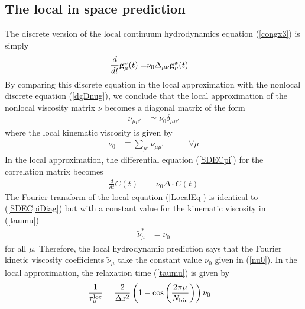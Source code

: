 \documentclass[b5paper,openright,10pt]{book}
\newcommand{\esc}{\!\cdot\!}
\begin{document}
\subsection{The local in space prediction}
The   discrete   version   of  the   local   continuum   hydrodynamics
equation (\ref{congx3}) is simply
\begin{align}
  \frac{d}{dt}{\bf g}^{x}_\mu(t)=&\nu_0\Delta_{\mu\nu}{\bf g}^{x}_\nu(t)
\label{gloc}
\end{align}
By comparing  this discrete equation  in the local  approximation with
the nonlocal  discrete equation  (\ref{dgDnug}), we conclude  that the
local approximation of the nonlocal viscosity matrix $\nu$ becomes a
diagonal matrix of the form
\begin{align}
\nu_{\mu\mu'}&\simeq \nu_0 \delta_{\mu\mu'}
\end{align}
where the local kinematic viscosity is given by
\begin{align}
\nu_0&\equiv \sum_{\mu'}\nu_{\mu\mu'} \quad \quad \quad\forall \mu
\label{nu0}
\end{align}
In the  local approximation, the differential  equation (\ref{SDECpi})
for the correlation matrix becomes
\begin{align}
  \frac{d}{dt}{C}(t)=&\nu_0{\Delta}\esc { C}(t)
  \label{LocalEq}
\end{align}
The Fourier transform of the local equation (\ref{LocalEq}) is identical to
(\ref{SDECpiDiag})  but  with  a  constant  value  for  the  kinematic
viscosity in (\ref{taumu})
\begin{align}
\tilde{\nu}^*_\mu&= \nu_0
\label{numunu0}
\end{align}
for all $\mu$. Therefore, the  local hydrodynamic prediction says that
the Fourier kinetic viscosity  coefficients $\tilde{\nu}_\mu$ take the
constant value $\nu_0$ given in (\ref{nu0}).
In the local approximation, the relaxation time (\ref{taumu}) is given by 
\begin{align}
 \frac{1}{\tau^{\rm loc}_\mu}&=\frac{2}{\Delta z^2}
\left(1-\cos\left( \frac{2\pi \mu}{N_{\rm bin}}\right)\right)
\nu_0
\label{taumuloc}
\end{align}



\end{document}
